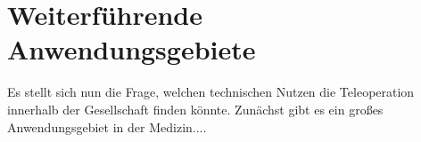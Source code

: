 \section{Weiterführende Anwendungsgebiete}
Es stellt sich nun die Frage, welchen technischen Nutzen die Teleoperation innerhalb der Gesellschaft finden könnte.
Zunächst gibt es ein großes Anwendungsgebiet in der Medizin....

